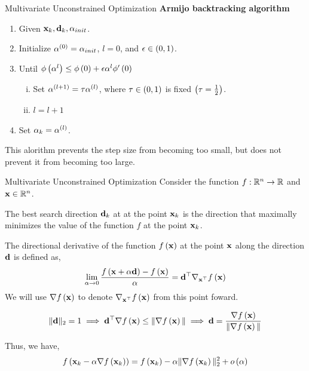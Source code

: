 \documentclass[aspectratio=169]{beamer}
\let\olditem\item
\renewcommand{\item}{\setlength{\itemsep}{\fill}\olditem}
\def\mf{\ensuremath\mathbf}
\def\mb{\ensuremath\mathbb}
\def\lp{\ensuremath\left(}
\def\rp{\ensuremath\right)}
\def\R{\ensuremath\mb{R}}
\newcommand{\ct}[1]{\lp #1\rp}
\begin{document}
\begin{frame} {Multivariate Unconstrained Optimization} 
  \textbf{Armijo backtracking algorithm}
  \begin{enumerate}[(1)]
    \item Given $\mf{x}_k, \mf{d}_k, \alpha_{init}$.
    \item Initialize $\alpha^{\ct{0}} = \alpha_{init}$, $l = 0$, and $\epsilon \in \ct{0, 1}$.
    \item Until $\phi\ct{\alpha^{l}} \leq \phi\ct{0} + \epsilon \alpha^{l} \phi'\ct{0}$
      \begin{enumerate}[(i)]
        \item Set $\alpha^{\ct{l+1}} = \tau \alpha^{\ct{l}}$, where $\tau \in \ct{0, 1}$ is fixed $\ct{\tau = \frac{1}{2}}$.
        \item $l = l + 1$
      \end{enumerate}
    \item Set $\alpha_k = \alpha^{\ct{l}}$.
  \end{enumerate}

  This alorithm prevents the step size from becoming too small, but does not prevent it from becoming too large.
\end{frame}


\begin{frame} {Multivariate Unconstrained Optimization}
  Consider the function $f: \R^n \to \R$ and $\mf{x} \in \R^n$.
  \vspace{0.25cm}

  The best search direction $\mf{d}_k$ at at the point $\mf{x}_k$ is the direction that maximally minimizes the value of the function $f$ at the point $\mf{x}_k$.
  \vspace{0.25cm}

  The directional derivative of the function $f\ct{\mf{x}}$ at the point $\mf{x}$ along the direction $\mf{d}$ is defined as,
  \[ \lim_{\alpha \to 0} \frac{f\ct{\mf{x} + \alpha \mf{d}} - f\ct{\mf{x}}}{\alpha} = \mf{d}^\top \nabla_{\mf{x}^\top} f\ct{\mf{x}} \]
  We will use $\nabla f\ct{\mf{x}}$ to denote $\nabla_{\mf{x}^\top} f\ct{\mf{x}}$ from this point foward.

  \[ \Vert \mf{d} \Vert_2 = 1 \implies \mf{d}^\top \nabla f\ct{\mf{x}} \leq \Vert \nabla f\ct{\mf{x}} \Vert \implies \mf{d} = \frac{\nabla f\ct{\mf{x}}}{\Vert \nabla f\ct{\mf{x}} \Vert} \]

  Thus, we have,
  \[ f\ct{\mf{x}_k - \alpha \nabla f\ct{\mf{x}_k}} =  f\ct{\mf{x}_k} - \alpha \Vert \nabla f\ct{\mf{x}_k} \Vert_2^2 + o\ct{\alpha} \]
\end{frame}
\end{document}
